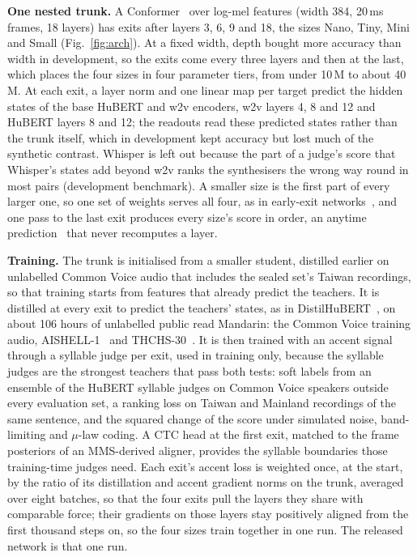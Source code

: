 \documentclass{Interspeech}
\begin{document}
\textbf{One nested trunk.} A Conformer~\cite{gulati2020conformer} over log-mel features (width 384, 20\,ms frames, 18 layers) has exits after layers 3, 6, 9 and 18, the sizes Nano, Tiny, Mini and Small (Fig.~\ref{fig:arch}). At a fixed width, depth bought more accuracy than width in development, so the exits come every three layers and then at the last, which places the four sizes in four parameter tiers, from under 10\,M to about 40\,M. At each exit, a layer norm and one linear map per target predict the hidden states of the base HuBERT and w2v encoders, w2v layers 4, 8 and 12 and HuBERT layers 8 and 12; the readouts read these predicted states rather than the trunk itself, which in development kept accuracy but lost much of the synthetic contrast. Whisper is left out because the part of a judge's score that Whisper's states add beyond w2v ranks the synthesisers the wrong way round in most pairs (development benchmark). A smaller size is the first part of every larger one, so one set of weights serves all four, as in early-exit networks~\cite{teerapittayanon2016branchynet}, and one pass to the last exit produces every size's score in order, an anytime prediction~\cite{huang2018msdnet} that never recomputes a layer.

\textbf{Training.} The trunk is initialised from a smaller student, distilled earlier on unlabelled Common Voice audio that includes the sealed set's Taiwan recordings, so that training starts from features that already predict the teachers. It is distilled at every exit to predict the teachers' states, as in DistilHuBERT~\cite{chang2022distilhubert}, on about 106 hours of unlabelled public read Mandarin: the Common Voice training audio, AISHELL-1~\cite{bu2017aishell} and THCHS-30~\cite{wang2015thchs30}. It is then trained with an accent signal through a syllable judge per exit, used in training only, because the syllable judges are the strongest teachers that pass both tests: soft labels from an ensemble of the HuBERT syllable judges on Common Voice speakers outside every evaluation set, a ranking loss on Taiwan and Mainland recordings of the same sentence, and the squared change of the score under simulated noise, band-limiting and $\mu$-law coding. A CTC head at the first exit, matched to the frame posteriors of an MMS-derived aligner, provides the syllable boundaries those training-time judges need. Each exit's accent loss is weighted once, at the start, by the ratio of its distillation and accent gradient norms on the trunk, averaged over eight batches, so that the four exits pull the layers they share with comparable force; their gradients on those layers stay positively aligned from the first thousand steps on, so the four sizes train together in one run. The released network is that one run.
\end{document}
